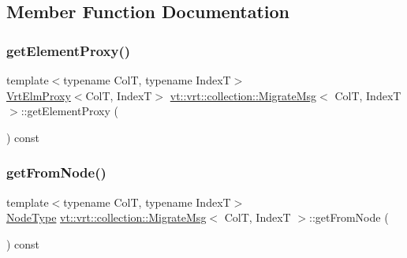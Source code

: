 \subsection{Member Function Documentation}
\mbox{\label{structvt_1_1vrt_1_1collection_1_1_migrate_msg_a6a8d4f819ebe556df1f3533bfa0e21f2}} 
\subsubsection{\texorpdfstring{get\+Element\+Proxy()}{getElementProxy()}}
{\footnotesize\ttfamily template$<$typename ColT, typename IndexT$>$ \\
\hyperlink{structvt_1_1vrt_1_1collection_1_1_vrt_elm_proxy}{Vrt\+Elm\+Proxy}$<$ColT, IndexT$>$ \hyperlink{structvt_1_1vrt_1_1collection_1_1_migrate_msg}{vt\+::vrt\+::collection\+::\+Migrate\+Msg}$<$ ColT, IndexT $>$\+::get\+Element\+Proxy (\begin{DoxyParamCaption}{ }\end{DoxyParamCaption}) const\hspace{0.3cm}{\ttfamily [inline]}}

\mbox{\label{structvt_1_1vrt_1_1collection_1_1_migrate_msg_ab3b156dd31382eab3551024ee3668fad}} 
\subsubsection{\texorpdfstring{get\+From\+Node()}{getFromNode()}}
{\footnotesize\ttfamily template$<$typename ColT, typename IndexT$>$ \\
\hyperlink{namespacevt_a866da9d0efc19c0a1ce79e9e492f47e2}{Node\+Type} \hyperlink{structvt_1_1vrt_1_1collection_1_1_migrate_msg}{vt\+::vrt\+::collection\+::\+Migrate\+Msg}$<$ ColT, IndexT $>$\+::get\+From\+Node (\begin{DoxyParamCaption}{ }\end{DoxyParamCaption}) const\hspace{0.3cm}{\ttfamily [inline]}}

